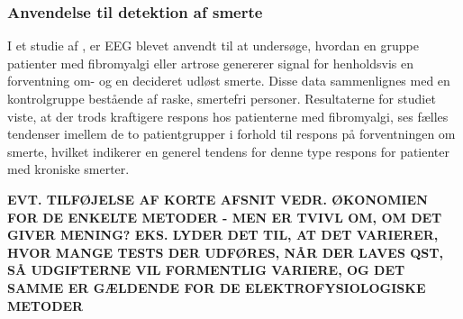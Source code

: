 \subsubsection{Anvendelse til detektion af smerte}
I et studie af \citep{7}, er EEG blevet anvendt til at undersøge, hvordan en gruppe patienter med fibromyalgi eller artrose genererer signal for henholdsvis en forventning om- og en decideret udløst smerte. Disse data sammenlignes med en kontrolgruppe bestående af raske, smertefri personer. Resultaterne for studiet viste, at der trods kraftigere respons hos patienterne med fibromyalgi, ses fælles tendenser imellem de to patientgrupper i forhold til respons på forventningen om smerte, hvilket indikerer en generel tendens for denne type respons for patienter med kroniske smerter. \citep{7}
   
\textbf{EVT. TILFØJELSE AF KORTE AFSNIT VEDR. ØKONOMIEN FOR DE ENKELTE METODER - MEN ER TVIVL OM, OM DET GIVER MENING? EKS. LYDER DET TIL, AT DET VARIERER, HVOR MANGE TESTS DER UDFØRES, NÅR DER LAVES QST, SÅ UDGIFTERNE VIL FORMENTLIG VARIERE, OG DET SAMME ER GÆLDENDE FOR DE ELEKTROFYSIOLOGISKE METODER}
